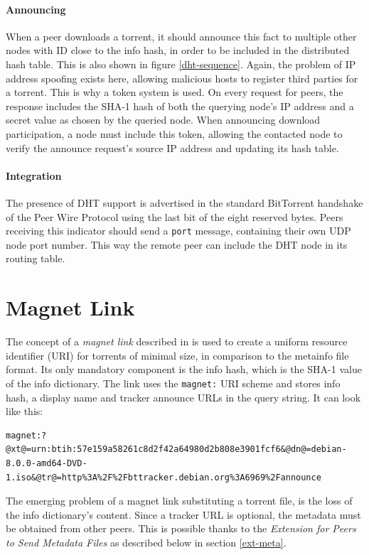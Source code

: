 \documentclass[10pt, a4paper, twoside, headsepline]{scrbook}
\renewcommand{\_}{\origunderscore\allowbreak}
\begin{document}
\paragraph{Announcing}
When a peer downloads a torrent, it should announce this fact to multiple other nodes with ID close to the info hash, in order to be included in the distributed hash table. This is also shown in figure \ref{dht-sequence}. Again, the problem of IP address spoofing exists here, allowing malicious hosts to register third parties for a torrent. This is why a token system is used. On every request for peers, the response includes the SHA-1 hash of both the querying node's IP address and a secret value as chosen by the queried node. When announcing download participation, a node must include this token, allowing the contacted node to verify the announce request's source IP address and updating its hash table.

\paragraph{Integration}
The presence of DHT support is advertised in the standard BitTorrent handshake of the Peer Wire Protocol using the last bit of the eight reserved bytes. Peers receiving this indicator should send a \texttt{port} message, containing their own UDP node port number. This way the remote peer can include the DHT node in its routing table.

\section{Magnet Link}
\label{magnet}
The concept of a \emph{magnet link} described in \cite{bep9} is used to create a uniform resource identifier (URI) for torrents of minimal size, in comparison to the metainfo file format. Its only mandatory component is the info hash, which is the SHA-1 value of the info dictionary. The link uses the \texttt{magnet:} URI scheme and stores info hash, a display name and tracker announce URLs in the query string. It can look like this:
\begin{lstlisting}
magnet:?@xt@=urn:btih:57e159a58261c8d2f42a64980d2b808e3901fcf6&@dn@=debian-8.0.0-amd64-DVD-1.iso&@tr@=http%3A%2F%2Fbttracker.debian.org%3A6969%2Fannounce
\end{lstlisting}
The emerging problem of a magnet link substituting a torrent file, is the loss of the info dictionary's content. Since a tracker URL is optional, the metadata must be obtained from other peers. This is possible thanks to the \emph{Extension for Peers to Send Metadata Files} as described below in section \ref{ext-meta}.
\end{document}
